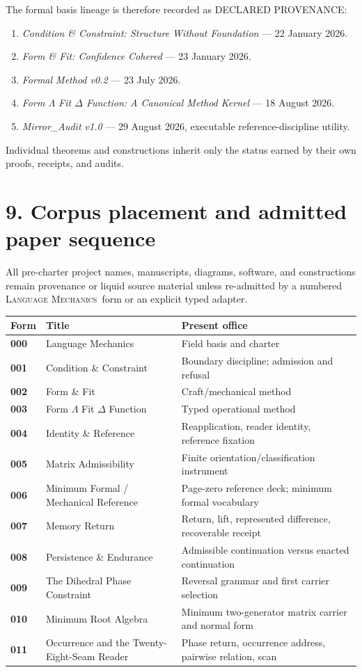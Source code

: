 \documentclass[10.5pt]{article}
\newcommand{\status}[1]{\textsf{#1}}
\newcommand{\LM}{\textsc{Language Mechanics}}
\begin{document}
The formal basis lineage is therefore recorded as \status{DECLARED PROVENANCE}:
\begin{enumerate}
\item \emph{Condition \& Constraint: Structure Without Foundation} --- 22 January 2026.
\item \emph{Form \& Fit: Confidence Cohered} --- 23 January 2026.
\item \emph{Formal Method v0.2} --- 23 July 2026.
\item \emph{Form $\Lambda$ Fit $\Delta$ Function: A Canonical Method Kernel} --- 18 August 2026.
\item \emph{Mirror\_Audit v1.0} --- 29 August 2026, executable reference-discipline utility.
\end{enumerate}
Individual theorems and constructions inherit only the status earned by their own proofs, receipts, and audits.

\section*{9. Corpus placement and admitted paper sequence}
All pre-charter project names, manuscripts, diagrams, software, and constructions remain provenance or liquid source material unless re-admitted by a numbered \LM\ form or an explicit typed adapter.

\begin{center}
\small
\begin{longtable}{>{\bfseries}p{}p{}p{}}
\toprule
Form & Title & Present office\\
\midrule
000 & Language Mechanics & Field basis and charter\\
001 & Condition \& Constraint & Boundary discipline; admission and refusal\\
002 & Form \& Fit & Craft/mechanical method\\
003 & Form $\Lambda$ Fit $\Delta$ Function & Typed operational method\\
004 & Identity \& Reference & Reapplication, reader identity, reference fixation\\
005 & Matrix Admissibility & Finite orientation/classification instrument\\
006 & Minimum Formal / Mechanical Reference & Page-zero reference deck; minimum formal vocabulary\\
007 & Memory Return & Return, lift, represented difference, recoverable receipt\\
008 & Persistence \& Endurance & Admissible continuation versus enacted continuation\\
009 & The Dihedral Phase Constraint & Reversal grammar and first carrier selection\\
010 & Minimum Root Algebra & Minimum two-generator matrix carrier and normal form\\
011 & Occurrence and the Twenty-Eight-Seam Reader & Phase return, occurrence address, pairwise relation, scan\\
\bottomrule
\end{longtable}
\end{center}
\end{document}
